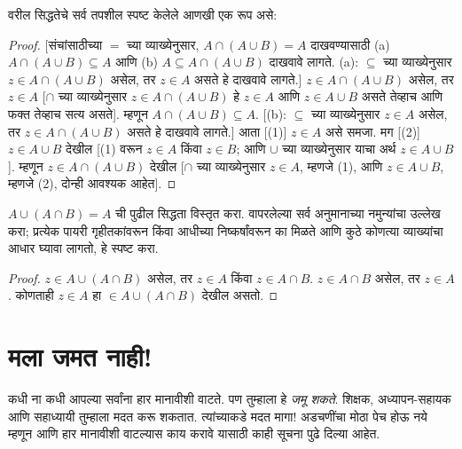 वरील सिद्धतेचे सर्व तपशील स्पष्ट केलेले आणखी एक रूप असे:
\begin{proof}{}
[संचांसाठीच्या $=$ च्या व्याख्येनुसार, $A \cap (A \cup B) = A$ दाखवण्यासाठी (a) $A \cap (A \cup B) \subseteq A$ आणि (b) $A \subseteq A \cap (A \cup B)$ दाखवावे लागते. (a): $\subseteq$ च्या व्याख्येनुसार $z \in A \cap (A \cup B)$ असेल, तर $z \in A$ असते हे दाखवावे लागते.] $z \in A \cap (A \cup B)$ असेल, तर $z \in A$ [$\cap$ च्या व्याख्येनुसार $z \in A \cap (A \cup B)$ हे $z \in A$ आणि $z \in A \cup B$ असते तेव्हाच आणि फक्त तेव्हाच सत्य असते]. म्हणून $A \cap (A \cup B) \subseteq A$. [(b): $\subseteq$ च्या व्याख्येनुसार $z \in A$ असेल, तर $z \in A \cap (A \cup B)$ असते हे दाखवावे लागते.] आता [(1)] $z \in A$ असे समजा. मग [(2)] $z \in A \cup B$ देखील [(1) वरून $z \in A$ किंवा $z \in B$; आणि $\cup$ च्या व्याख्येनुसार याचा अर्थ $z \in A \cup B$]. म्हणून $z \in A \cap (A \cup B)$ देखील [$\cap$ च्या व्याख्येनुसार $z \in A$, म्हणजे (1), आणि $z \in A \cup B$, म्हणजे (2), दोन्ही आवश्यक आहेत].
\end{proof}

\begin{prob}
$A \cup (A \cap B) = A$ ची पुढील सिद्धता विस्तृत करा. वापरलेल्या सर्व अनुमानाच्या नमुन्यांचा उल्लेख करा; प्रत्येक पायरी गृहीतकांवरून किंवा आधीच्या निष्कर्षांवरून का मिळते आणि कुठे कोणत्या व्याख्यांचा आधार घ्यावा लागतो, हे स्पष्ट करा.
\begin{proof}
$z \in A \cup (A \cap B)$ असेल, तर $z \in A$ किंवा $z \in A \cap B$. $z \in A \cap B$ असेल, तर $z \in A$. कोणताही $z \in A$ हा $\in A \cup (A \cap B)$ देखील असतो.
\end{proof}
\end{prob}












\section{मला जमत नाही!{}}\label{mth:prf:cnt:sec}

कधी ना कधी आपल्या सर्वांना हार मानावीशी वाटते. पण तुम्हाला हे \emph{जमू शकते}. शिक्षक, अध्यापन-सहायक आणि सहाध्यायी तुम्हाला मदत करू शकतात. त्यांच्याकडे मदत मागा!{} अडचणींचा मोठा पेच होऊ नये म्हणून आणि हार मानावीशी वाटल्यास काय करावे यासाठी काही सूचना पुढे दिल्या आहेत.

